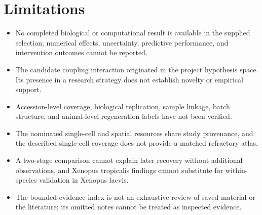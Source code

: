 \documentclass[11pt]{article}
\begin{document}
\section{Limitations}
\begin{itemize}
\item No completed biological or computational result is available in the supplied selection; numerical effects, uncertainty, predictive performance, and intervention outcomes cannot be reported.
\item The candidate coupling interaction originated in the project hypothesis space. Its presence in a research strategy does not establish novelty or empirical support.
\item Accession-level coverage, biological replication, sample linkage, batch structure, and animal-level regeneration labels have not been verified.
\item The nominated single-cell and spatial resources share study provenance, and the described single-cell coverage does not provide a matched refractory atlas.
\item A two-stage comparison cannot explain later recovery without additional observations, and Xenopus tropicalis findings cannot substitute for within-species validation in Xenopus laevis.
\item The bounded evidence index is not an exhaustive review of saved material or the literature; its omitted notes cannot be treated as inspected evidence.
\end{itemize}
\end{document}
